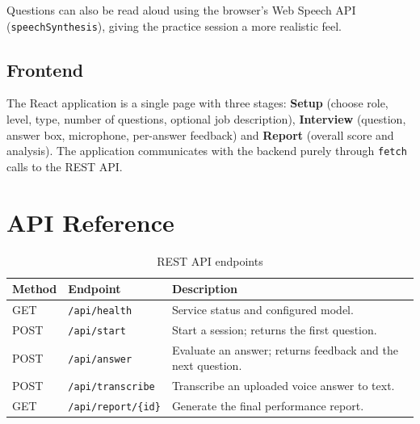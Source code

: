 \documentclass[11pt,a4paper]{article}
\newcommand{\code}[1]{\texttt{#1}}
\begin{document}
Questions can also be read aloud using the browser's Web Speech API
(\code{speechSynthesis}), giving the practice session a more realistic feel.

\subsection{Frontend}
The React application is a single page with three stages: \textbf{Setup}
(choose role, level, type, number of questions, optional job description),
\textbf{Interview} (question, answer box, microphone, per-answer feedback) and
\textbf{Report} (overall score and analysis). The application communicates with the
backend purely through \code{fetch} calls to the REST API.

\section{API Reference}

\begin{table}[h]
\centering
\renewcommand{\arraystretch}{1.25}
\begin{tabularx}{\textwidth}{@{}l l X@{}}
\toprule
\textbf{Method} & \textbf{Endpoint} & \textbf{Description} \\
\midrule
GET  & \code{/api/health}            & Service status and configured model. \\
POST & \code{/api/start}             & Start a session; returns the first question. \\
POST & \code{/api/answer}            & Evaluate an answer; returns feedback and the next question. \\
POST & \code{/api/transcribe}        & Transcribe an uploaded voice answer to text. \\
GET  & \code{/api/report/\{id\}}      & Generate the final performance report. \\
\bottomrule
\end{tabularx}
\caption{REST API endpoints}
\end{table}

\end{document}

